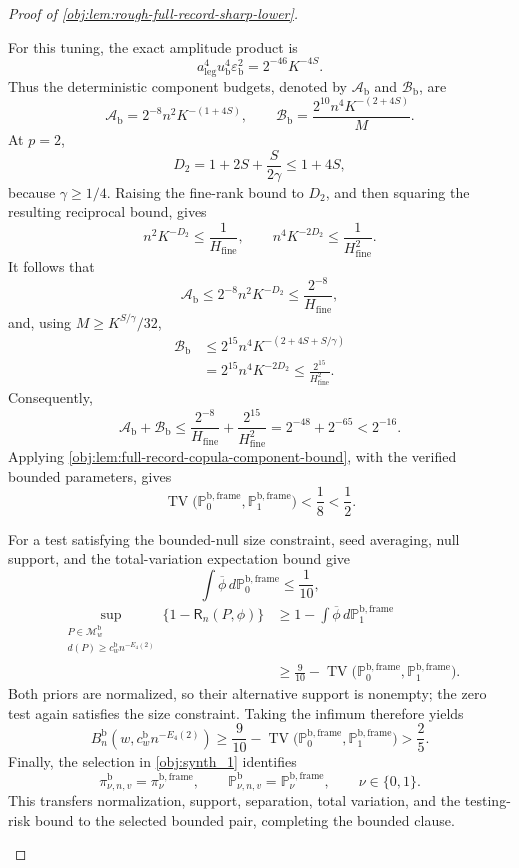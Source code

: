 \documentclass[11pt]{article}
\begin{document}
\begin{proof}[Proof of \cref{obj:lem:rough-full-record-sharp-lower}]
\begin{enumerate}
For this tuning, the exact amplitude product is
\[
a_{\mathrm{leg}}^4u_{\mathrm b}^4\varepsilon_{\mathrm b}^2
=2^{-46}K^{-4S}.
\]
Thus the deterministic component budgets, denoted by
\(\mathcal A_{\mathrm b}\) and \(\mathcal B_{\mathrm b}\), are
\[
\mathcal A_{\mathrm b}
=2^{-8}n^2K^{-(1+4S)},
\qquad
\mathcal B_{\mathrm b}
=\frac{2^{10}n^4K^{-(2+4S)}}{M}.
\]
At \(p=2\),
\[
D_2=1+2S+\frac{S}{2\gamma}
\le1+4S,
\]
because \(\gamma\ge1/4\). Raising the fine-rank bound to \(D_2\), and then squaring the resulting reciprocal bound, gives
\[
n^2K^{-D_2}\le\frac1{H_{\mathrm{fine}}},
\qquad
n^4K^{-2D_2}\le\frac1{H_{\mathrm{fine}}^2}.
\]
It follows that
\[
\mathcal A_{\mathrm b}
\le2^{-8}n^2K^{-D_2}
\le\frac{2^{-8}}{H_{\mathrm{fine}}},
\]
and, using \(M\ge K^{S/\gamma}/32\),
\[
\begin{aligned}
\mathcal B_{\mathrm b}
&\le
2^{15}n^4K^{-(2+4S+S/\gamma)}\\
&=
2^{15}n^4K^{-2D_2}
\le\frac{2^{15}}{H_{\mathrm{fine}}^2}.
\end{aligned}
\]
Consequently,
\[
\mathcal A_{\mathrm b}+\mathcal B_{\mathrm b}
\le
\frac{2^{-8}}{H_{\mathrm{fine}}}
+\frac{2^{15}}{H_{\mathrm{fine}}^2}
=
2^{-48}+2^{-65}<2^{-16}.
\]
Applying \cref{obj:lem:full-record-copula-component-bound}, with the verified bounded parameters, gives
\[
\operatorname{TV}
\bigl(\mathbb P_0^{\mathrm{b,frame}},
      \mathbb P_1^{\mathrm{b,frame}}\bigr)
<\frac18<\frac12.
\]

For a test satisfying the bounded-null size constraint, seed averaging, null support, and the total-variation expectation bound give
\[
\int\overline\phi\,d\mathbb P_0^{\mathrm{b,frame}}\le\frac1{10},
\]
\[
\begin{aligned}
\sup_{\substack{P\in\mathcal M_w^{\mathrm b}\\
d(P)\ge c_w^{\mathrm b}n^{-E_4(2)}}}
\{1-\mathsf R_n(P,\phi)\}
&\ge
1-\int\overline\phi\,d\mathbb P_1^{\mathrm{b,frame}}\\
&\ge
\frac9{10}
-\operatorname{TV}
\bigl(\mathbb P_0^{\mathrm{b,frame}},
      \mathbb P_1^{\mathrm{b,frame}}\bigr).
\end{aligned}
\]
Both priors are normalized, so their alternative support is nonempty; the zero test again satisfies the size constraint. Taking the infimum therefore yields
\[
B_n^{\mathrm b}\!\left(w,c_w^{\mathrm b}n^{-E_4(2)}\right)
\ge
\frac9{10}
-\operatorname{TV}
\bigl(\mathbb P_0^{\mathrm{b,frame}},
      \mathbb P_1^{\mathrm{b,frame}}\bigr)
>\frac25.
\]
Finally, the selection in \cref{obj:synth_1} identifies
\[
\pi^{\mathrm b}_{\nu,n,v}=\pi_\nu^{\mathrm{b,frame}},
\qquad
\mathbb P^{\mathrm b}_{\nu,n,v}
=\mathbb P_\nu^{\mathrm{b,frame}},
\qquad \nu\in\{0,1\}.
\]
This transfers normalization, support, separation, total variation, and the testing-risk bound to the selected bounded pair, completing the bounded clause.
\end{enumerate}
\end{proof}
\end{document}
